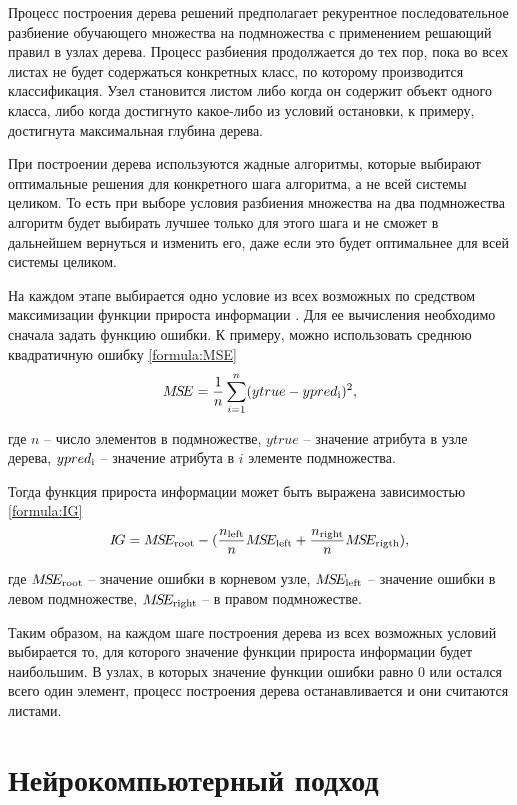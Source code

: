 Процесс построения дерева решений предполагает рекурентное последовательное разбиение обучающего множества на подмножества с применением решающий правил в узлах дерева. Процесс разбиения продолжается до тех пор, пока во всех листах не будет содержаться конкретных класс, по которому производится классификация. Узел становится листом либо когда он содержит объект одного класса, либо когда достигнуто какое-либо из условий остановки, к примеру, достигнута максимальная глубина дерева.

При построении дерева используются жадные алгоритмы, которые выбирают оптимальные решения для конкретного шага алгоритма, а не всей системы целиком. То есть при выборе условия разбиения множества на два подмножества алгоритм будет выбирать лучшее только для этого шага и не сможет в дальнейшем вернуться и изменить его, даже если это будет оптимальнее для всей системы целиком.

На каждом этапе выбирается одно условие из всех возможных по средством максимизации функции прироста информации \cite{solve_tree}. Для ее вычисления необходимо сначала задать функцию ошибки. К примеру, можно использовать среднюю квадратичную ошибку \ref{formula:MSE}
\begin{equation}\label{formula:MSE}
M\!S\!E = \frac{1}{n}\sum\limits_{i = 1}^{n}(ytrue - ypred_{\rm{i}})^2,
\end{equation} 

где $n$ -- число элементов в подмножестве, $ytrue$ -- значение атрибута в узле дерева, $ypred_{\rm{i}}$ -- значение атрибута в $i$ элементе подмножества.

Тогда функция прироста информации может быть выражена зависимостью \ref{formula:IG}
\begin{equation}\label{formula:IG}
I\!G = M\!S\!E_{\rm{root}} - (\frac{n_{\rm{left}}}{n}M\!S\!E_{\rm{left}} + \frac{n_{\rm{right}}}{n}M\!S\!E_{\rm{rigth}}),
\end{equation} 

где $M\!S\!E_{\rm{root}}$ -- значение ошибки в корневом узле, $M\!S\!E_{\rm{left}}$ -- значение ошибки в левом подмножестве, $M\!S\!E_{\rm{right}}$ -- в правом подмножестве.

Таким образом, на каждом шаге построения дерева из всех возможных условий выбирается то, для которого значение функции прироста информации будет наибольшим. В узлах, в которых значение функции ошибки равно 0 или остался всего один элемент, процесс построения дерева останавливается и они считаются листами.

\section{Нейрокомпьютерный подход}\label{sec:neuro}

